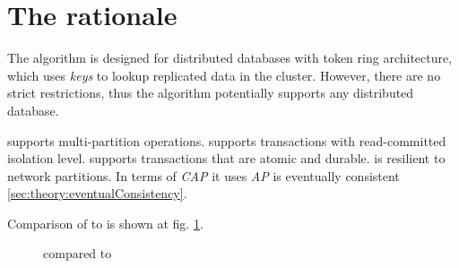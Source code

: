 
\section{The rationale}
The \mpt algorithm is designed for distributed databases with token ring architecture,
which uses \emph{keys} to lookup replicated data in the cluster. However, there are no strict restrictions, thus the algorithm potentially supports any distributed database.

\mpt supports multi-partition operations.
\mpt supports transactions with read-committed isolation level. 
\mpt supports transactions that are atomic and durable.
\mpt is resilient to network partitions. In terms of \emph{CAP} \cite{Brewer:2012ba} it uses \emph{AP}
\mpt is eventually consistent \ref{sec:theory:eventualConsistency}. 

Comparison of \mpt to \lwt is shown at fig. \ref{fig:mppVsLwt}.

\begin{figure}[hbt]
  \setlength{\unitlength}{1.3cm}  
  \caption{\mpt compared to \lwt}
  \label{fig:mppVsLwt}
\end{figure}





